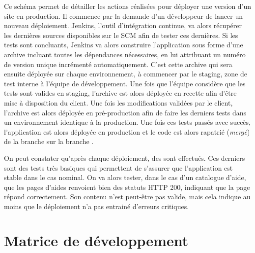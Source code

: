 \begin{normalsize}
Ce schéma permet de détailler les actions réalisées pour déployer une version d'un site \naq{} en production. Il commence par la demande d'un développeur de lancer un nouveau déploiement. Jenkins, l'outil d'intégration continue, va alors récupérer les dernières sources disponibles sur le \gls{SCM} afin de tester ces dernières. Si les tests sont concluants, Jenkins va alors construire l'application sous forme d'une archive incluant toutes les dépendances nécessaires, en lui attribuant un numéro de version unique incrémenté automatiquement. C'est cette archive qui sera ensuite déployée sur chaque environnement, à commencer par le staging, zone de test interne à l'équipe de développement. Une fois que l'équipe considère que les tests sont valides en staging, l'archive est alors déployée en recette afin d'être mise à disposition du client. Une fois les modifications validées par le client, l'archive est alors déployée en pré-production afin de faire les derniers tests dans un environnement identique à la production. Une fois ces tests passés avec succès, l'application est alors déployée en production et le code est alors rapatrié (\emph{mergé}) de la branche  sur la branche . 

On peut constater qu'après chaque déploiement, des  sont effectués. Ces derniers sont des tests très basiques qui permettent de s'assurer que l'application est stable dans le cas nominal. On va alors tester, dans le cas d'un catalogue d'aide, que les pages d'aides renvoient bien des statuts \gls{HTTP} 200, indiquant que la page répond correctement. Son contenu n'est peut-être pas valide, mais cela indique au moins que le déploiement n'a pas entrainé d'erreurs critiques. 
\end{normalsize}


\clearpage
\section{Matrice de développement \devops}

